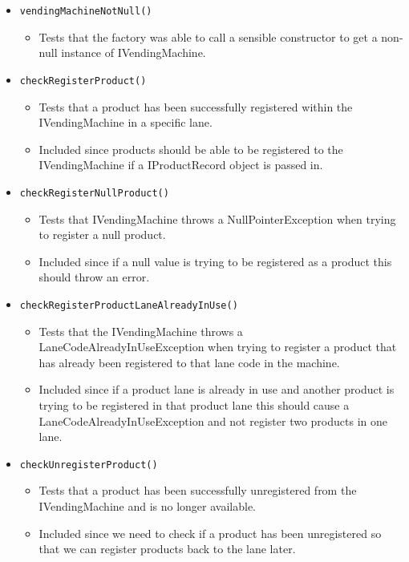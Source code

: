 \documentclass{article}
\begin{document}
\begin{itemize}

\item \verb+vendingMachineNotNull()+
\begin{itemize}
\item Tests that the factory was able to call a sensible constructor to get a non-null instance of IVendingMachine.
\end{itemize}

\item \verb+checkRegisterProduct()+
\begin{itemize}
\item Tests that a product has been successfully registered within the IVendingMachine in a specific lane.
\item Included since products should be able to be registered to the IVendingMachine if a IProductRecord object is passed in.
\end{itemize}

\item \verb+checkRegisterNullProduct()+
\begin{itemize}
\item Tests that IVendingMachine throws a NullPointerException when trying to register a null product.
\item Included since if a null value is trying to be registered as a product this should throw an error.
\end{itemize}

\item \verb+checkRegisterProductLaneAlreadyInUse()+
\begin{itemize}
\item Tests that the IVendingMachine throws a LaneCodeAlreadyInUseException when trying to register a product that has already been registered to that lane code in the machine.
\item Included since if a product lane is already in use and another product is trying to be registered in that product lane this should cause a LaneCodeAlreadyInUseException and not register two products in one lane.
\end{itemize}

\item \verb+checkUnregisterProduct()+
\begin{itemize}
\item Tests that a product has been successfully unregistered from the IVendingMachine and is no longer available.
\item Included since we need to check if a product has been unregistered so that we can register products back to the lane later.
\end{itemize}


\end{itemize}
\end{document}
